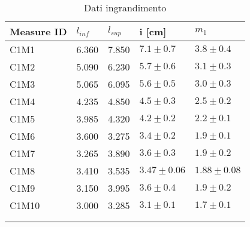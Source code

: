 \begin{longtable}[]{@{}lllll@{}}
    \toprule
    Measure ID & $l_{inf}$ & $l_{sup}$ & i [cm] & $m_1$ \tabularnewline
    \midrule
    \endhead
    C1M1  & 6.360 & 7.850 & $7.1 \pm 0.7$   & $3.8 \pm 0.4$ \tabularnewline
    C1M2  & 5.090 & 6.230 & $5.7 \pm 0.6$   & $3.1 \pm 0.3$ \tabularnewline
    C1M3  & 5.065 & 6.095 & $5.6 \pm 0.5$   & $3.0 \pm 0.3$ \tabularnewline
    C1M4  & 4.235 & 4.850 & $4.5 \pm 0.3$   & $2.5 \pm 0.2$ \tabularnewline
    C1M5  & 3.985 & 4.320 & $4.2 \pm 0.2$   & $2.2 \pm 0.1$ \tabularnewline
    C1M6  & 3.600 & 3.275 & $3.4 \pm 0.2$   & $1.9 \pm 0.1$ \tabularnewline
    C1M7  & 3.265 & 3.890 & $3.6 \pm 0.3$   & $1.9 \pm 0.2$ \tabularnewline
    C1M8  & 3.410 & 3.535 & $3.47 \pm 0.06$ & $1.88 \pm 0.08$ \tabularnewline
    C1M9  & 3.150 & 3.995 & $3.6 \pm 0.4$   & $1.9 \pm 0.2$ \tabularnewline
    C1M10 & 3.000 & 3.285 & $3.1 \pm 0.1$   & $1.7 \pm 0.1$ \tabularnewline
    \bottomrule
    \label{tab:ingrandimento}
    \\
    \caption{Dati ingrandimento}
 \end{longtable}
